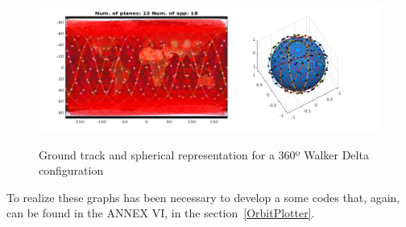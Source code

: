 \begin{figure}[H] %
	\centering
	\includegraphics[width=1\textwidth]{./testing/WB360.png}\\
	\caption{Ground track and spherical representation for a 360º Walker Delta configuration}
	\label{fig:graph120}
\end{figure}

To realize these graphs has been necessary to develop a some codes that, again, can be found in the ANNEX VI, in the section~\ref{OrbitPlotter}.